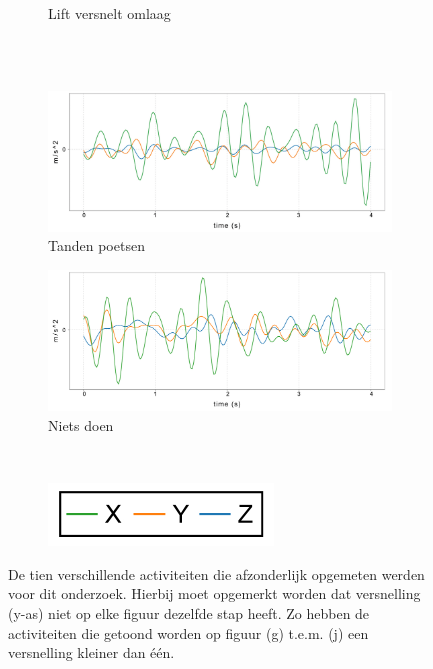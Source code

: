 \documentclass{article}
\begin{document}
\begin{figure}[hb!]
\begin{subfigure}[b]{.49\linewidth}
    \caption{Lift versnelt omlaag}\label{fig:1h}
  \end{subfigure} \\~\\
  \begin{subfigure}[b]{.49\linewidth}
    \centering
    \includegraphics[width=.70\textwidth]{figures/tandenpoetsen}
    \caption{Tanden poetsen}\label{fig:1i}
  \end{subfigure}
  \begin{subfigure}[b]{.49\linewidth}
    \centering
    \includegraphics[width=.70\textwidth]{figures/nietsdoen}
    \caption{Niets doen}\label{fig:1j}
  \end{subfigure} \\
  \begin{subfigure}[b]{.49\linewidth}
    \centering
    \includegraphics[width=.25\textwidth]{figures/legend}
  \end{subfigure}
  

  \caption{De tien verschillende activiteiten die afzonderlijk opgemeten werden voor dit onderzoek. Hierbij moet opgemerkt worden dat versnelling (y-as) niet op elke figuur dezelfde stap heeft. Zo hebben de activiteiten die getoond worden op figuur (g) t.e.m. (j) een versnelling kleiner dan \'e\'en.}
  \label{fig:8}
  
\end{figure}
\end{document}
